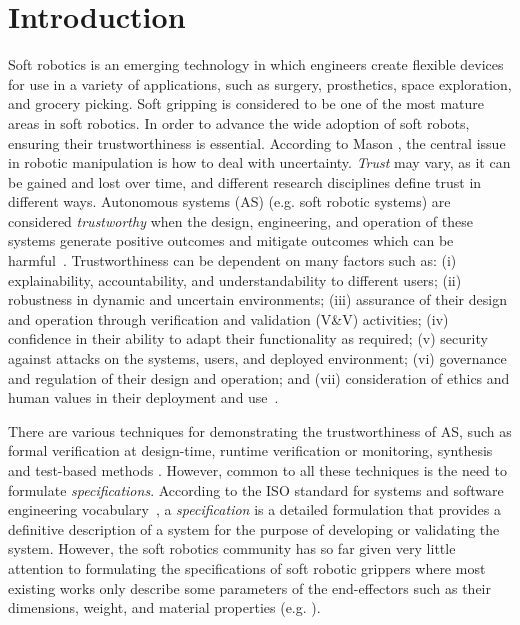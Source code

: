 \documentclass[lettersize,journal]{IEEEtran}
\begin{document}
\section{Introduction}\label{introduction}
Soft robotics is an emerging technology in which engineers create flexible devices for use in a variety of applications, such as surgery, prosthetics, space exploration, and grocery picking. 
Soft gripping is considered to be one of the most mature areas in soft robotics. 
In order to advance the wide adoption of soft robots, ensuring their trustworthiness is essential. 
According to Mason \cite{Mason1985}, the central issue in robotic manipulation is how to deal with uncertainty. %
\emph{Trust} may vary, as it can be gained and lost over time, and different research disciplines define trust in different ways. 
Autonomous systems (AS) (e.g. soft robotic systems) are considered \emph{trustworthy} when the design, engineering, and operation of these systems generate positive outcomes and mitigate outcomes which can be harmful~\cite{Naiseh2022}.
Trustworthiness can be dependent on many factors such as: (i) explainability, accountability, and understandability to different users; (ii) robustness in dynamic and uncertain environments; (iii) assurance of their design and operation through verification and validation (V\&V) activities; (iv) confidence in their ability to adapt their functionality as required; (v) security against attacks on the systems, users, and deployed environment; (vi) governance and regulation of their design and operation; and (vii) consideration of ethics and human values in their deployment and use~\cite{Naiseh2022}. 


There are various techniques for demonstrating the trustworthiness of AS, such as formal verification at design-time, runtime verification or monitoring, synthesis and test-based methods \cite{Abeywickrama2022}. 
However, common to all these techniques is the need to formulate \emph{specifications}. 	
According to the ISO standard for systems and software engineering vocabulary~\cite{ISO24765:2017}, a \emph{specification} is a detailed formulation that provides a definitive description of a system for the purpose of developing or validating the system. 
However, the soft robotics community has so far given very little attention to formulating the specifications of soft robotic grippers where most existing works only describe some parameters of the end-effectors such as their dimensions, weight, and material properties (e.g. \cite{Hong2022,Bhattacharya2019,Tadakuma2020,Loh2014,Nishikawa2019,Mohan2020}).  
\end{document}
